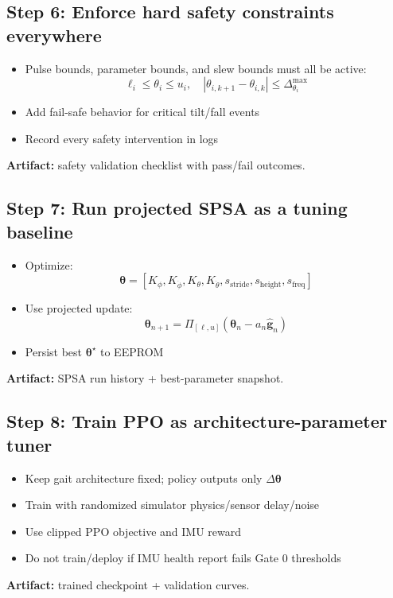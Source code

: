 \documentclass[11pt]{article}
\begin{document}
\subsection*{Step 6: Enforce hard safety constraints everywhere}
\begin{itemize}
    \item Pulse bounds, parameter bounds, and slew bounds must all be active:
    \[
    \ell_i \le \theta_i \le u_i,\quad
    |\theta_{i,k+1}-\theta_{i,k}| \le \Delta^{\max}_{\theta_i}
    \]
    \item Add fail-safe behavior for critical tilt/fall events
    \item Record every safety intervention in logs
\end{itemize}
\textbf{Artifact:} safety validation checklist with pass/fail outcomes.

\subsection*{Step 7: Run projected SPSA as a tuning baseline}
\begin{itemize}
    \item Optimize:
    \[
    \boldsymbol{\theta}=[K_{\phi},K_{\dot{\phi}},K_{\theta},K_{\dot{\theta}},s_{\mathrm{stride}},s_{\mathrm{height}},s_{\mathrm{freq}}]
    \]
    \item Use projected update:
    \[
    \boldsymbol{\theta}_{n+1}=\Pi_{[\ell,u]}(\boldsymbol{\theta}_n-a_n\hat{\mathbf{g}}_n)
    \]
    \item Persist best $\boldsymbol{\theta}^{\star}$ to EEPROM
\end{itemize}
\textbf{Artifact:} SPSA run history + best-parameter snapshot.

\subsection*{Step 8: Train PPO as architecture-parameter tuner}
\begin{itemize}
    \item Keep gait architecture fixed; policy outputs only $\Delta\boldsymbol{\theta}$
    \item Train with randomized simulator physics/sensor delay/noise
    \item Use clipped PPO objective and IMU reward
    \item Do not train/deploy if IMU health report fails Gate 0 thresholds
\end{itemize}
\textbf{Artifact:} trained checkpoint + validation curves.
\end{document}
